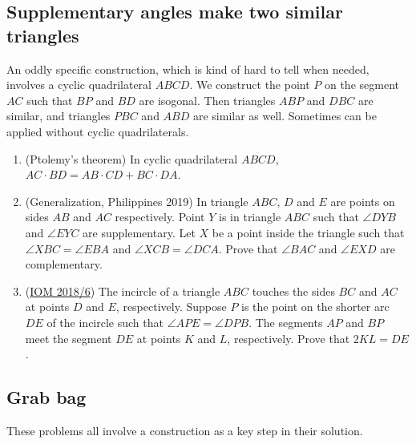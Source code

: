 \documentclass[11pt,paper=letter]{scrartcl}
\begin{document}
\subsection{Supplementary angles make two similar triangles}

An oddly specific construction, which is kind of hard to tell when needed, involves a cyclic quadrilateral $ABCD$. We construct the point $P$ on the segment $AC$ such that $BP$ and $BD$ are isogonal. Then triangles $ABP$ and $DBC$ are similar, and triangles $PBC$ and $ABD$ are similar as well. Sometimes can be applied without cyclic quadrilaterals.

\begin{enumerate}
  \item (Ptolemy's theorem) In cyclic quadrilateral $ABCD$, $AC \cdot BD = AB \cdot CD + BC \cdot DA$.

  \item (Generalization, Philippines 2019) In triangle $ABC$, $D$ and $E$ are points on sides $AB$ and $AC$ respectively. Point $Y$ is in triangle $ABC$ such that $\angle DYB$ and $\angle EYC$ are supplementary. Let $X$ be a point inside the triangle such that $\angle XBC = \angle EBA$ and $\angle XCB = \angle DCA$. Prove that $\angle BAC$ and $\angle EXD$ are complementary.
    
  \item (\href{https://aops.com/community/c6h1703436}{IOM 2018/6}) The incircle of a triangle $ABC$ touches the sides $BC$ and $AC$ at points $D$ and $E$, respectively. Suppose $P$ is the point on the shorter arc $DE$ of the incircle such that $\angle APE = \angle DPB$. The segments $AP$ and $BP$ meet the segment $DE$ at points $K$ and $L$, respectively. Prove that $2KL = DE$.
\end{enumerate}

\subsection{Grab bag}

These problems all involve a construction as a key step in their solution. 
\end{document}
